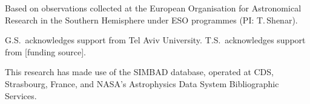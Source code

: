 \begin{acknowledgements}
Based on observations collected at the European Organisation for
Astronomical Research in the Southern Hemisphere under ESO programmes
\esoProgrammes (PI: T.\,Shenar).

G.S.\ acknowledges support from Tel Aviv University.
T.S.\ acknowledges support from [funding source].

This research has made use of the SIMBAD database, operated at CDS,
Strasbourg, France, and NASA's Astrophysics Data System Bibliographic
Services.
\end{acknowledgements}
